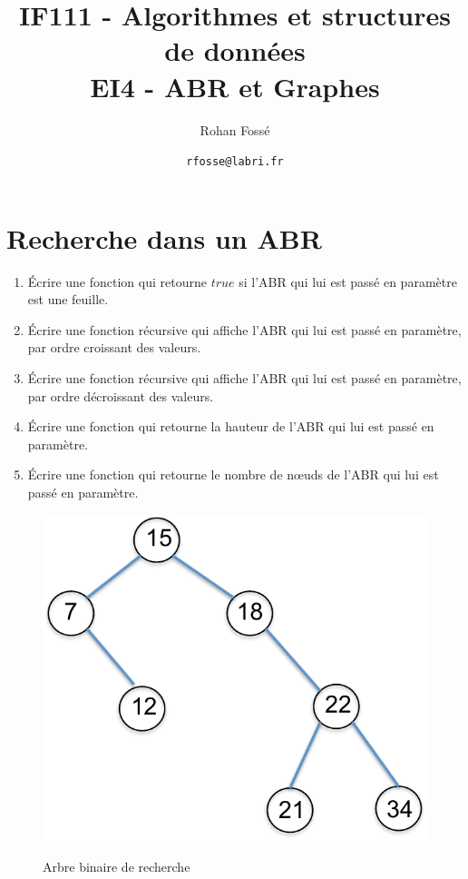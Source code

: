 \documentclass{article}[12pt]
\title{IF111 - Algorithmes et structures de données\\EI4 - ABR et Graphes}
\date{\texttt{rfosse@labri.fr}}
\author{Rohan Fossé}
\begin{document}
\maketitle{}


\section*{Recherche dans un ABR}
\begin{enumerate}
    \item Écrire une fonction qui retourne $true$ si l’ABR qui lui est passé en paramètre
est une feuille.
    \item  Écrire une fonction récursive qui affiche l’ABR qui lui est passé en paramètre, par ordre croissant des valeurs.
    \item Écrire une fonction récursive qui affiche l’ABR qui lui est passé en paramètre, par ordre décroissant des valeurs.
    \item Écrire une fonction qui retourne la hauteur de l’ABR qui lui est passé en
paramètre.
\item Écrire une fonction qui retourne le nombre de nœuds de l’ABR qui lui est
passé en paramètre.
\end{enumerate}

\begin{figure}[hbtp] 
  \centering
\includegraphics[scale =0.5] {ABR.pdf}\label{fig:abr} \caption{Arbre binaire de recherche}
\end{figure}
\end{document}
